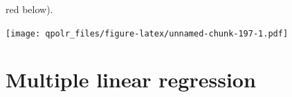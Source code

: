 \documentclass[12pt,oneside]{reedthesis}
\theoremstyle{definition}
\theoremstyle{definition}
\theoremstyle{definition}
\theoremstyle{remark}
\begin{document}
  red below).
  \begin{Shaded}
  \begin{Highlighting}[]
  \NormalTok{(}\OperatorTok{+}
  \StringTok{  }\NormalTok{(}\NormalTok{(}
          \NormalTok{) }\OperatorTok{+}
  \StringTok{  }\NormalTok{() }\OperatorTok{+}
  \StringTok{  }\NormalTok{(}\NormalTok{(}
  \end{Highlighting}
  \end{Shaded}
  \texttt{[image: qpolr\_files/figure-latex/unnamed-chunk-197-1.pdf]}
  
  \section{Multiple linear regression}\label{multiple-linear-regression}
  
\end{document}
